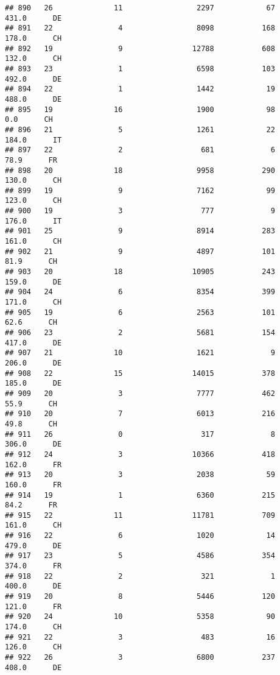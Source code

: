 \documentclass[
]{article}
\begin{document}
\begin{verbatim}
## 890   26              11                 2297            67    431.0      DE
## 891   22               4                 8098           168    178.0      CH
## 892   19               9                12788           608    132.0      CH
## 893   23               1                 6598           103    492.0      DE
## 894   22               1                 1442            19    488.0      DE
## 895   19              16                 1900            98      0.0      CH
## 896   21               5                 1261            22    184.0      IT
## 897   22               2                  681             6     78.9      FR
## 898   20              18                 9958           290    130.0      CH
## 899   19               9                 7162            99    123.0      CH
## 900   19               3                  777             9    176.0      IT
## 901   25               9                 8914           283    161.0      CH
## 902   21               9                 4897           101     81.9      CH
## 903   20              18                10905           243    159.0      DE
## 904   24               6                 8354           399    171.0      CH
## 905   19               6                 2563           101     62.6      CH
## 906   23               2                 5681           154    417.0      DE
## 907   21              10                 1621             9    206.0      DE
## 908   22              15                14015           378    185.0      DE
## 909   20               3                 7777           462     55.9      CH
## 910   20               7                 6013           216     49.8      CH
## 911   26               0                  317             8    306.0      DE
## 912   24               3                10366           418    162.0      FR
## 913   20               3                 2038            59    160.0      FR
## 914   19               1                 6360           215     84.2      FR
## 915   22              11                11781           709    161.0      CH
## 916   22               6                 1020            14    479.0      DE
## 917   23               5                 4586           354    374.0      FR
## 918   22               2                  321             1    400.0      DE
## 919   20               8                 5446           120    121.0      FR
## 920   24              10                 5358            90    174.0      CH
## 921   22               3                  483            16    126.0      CH
## 922   26               3                 6800           237    408.0      DE

\end{verbatim}
\end{document}
